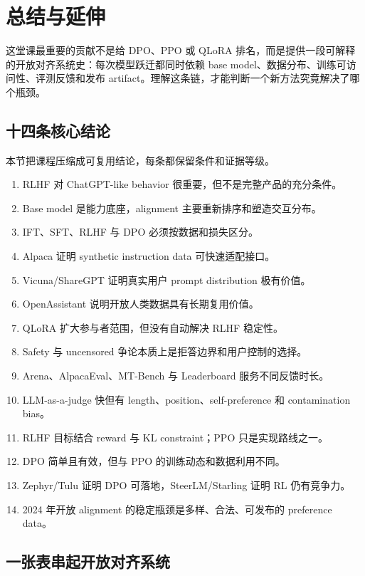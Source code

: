 \documentclass[a4paper]{article}
\begin{document}
\section{总结与延伸}

这堂课最重要的贡献不是给 DPO、PPO 或 QLoRA 排名，而是提供一段可解释的开放对齐系统史：每次模型跃迁都同时依赖 base model、数据分布、训练可访问性、评测反馈和发布 artifact。理解这条链，才能判断一个新方法究竟解决了哪个瓶颈。

\subsection{十四条核心结论}

本节把课程压缩成可复用结论，每条都保留条件和证据等级。

\begin{enumerate}
  \item RLHF 对 ChatGPT-like behavior 很重要，但不是完整产品的充分条件。
  \item Base model 是能力底座，alignment 主要重新排序和塑造交互分布。
  \item IFT、SFT、RLHF 与 DPO 必须按数据和损失区分。
  \item Alpaca 证明 synthetic instruction data 可快速适配接口。
  \item Vicuna/ShareGPT 证明真实用户 prompt distribution 极有价值。
  \item OpenAssistant 说明开放人类数据具有长期复用价值。
  \item QLoRA 扩大参与者范围，但没有自动解决 RLHF 稳定性。
  \item Safety 与 uncensored 争论本质上是拒答边界和用户控制的选择。
  \item Arena、AlpacaEval、MT-Bench 与 Leaderboard 服务不同反馈时长。
  \item LLM-as-a-judge 快但有 length、position、self-preference 和 contamination bias。
  \item RLHF 目标结合 reward 与 KL constraint；PPO 只是实现路线之一。
  \item DPO 简单且有效，但与 PPO 的训练动态和数据利用不同。
  \item Zephyr/Tulu 证明 DPO 可落地，SteerLM/Starling 证明 RL 仍有竞争力。
  \item 2024 年开放 alignment 的稳定瓶颈是多样、合法、可发布的 preference data。
\end{enumerate}

\subsection{一张表串起开放对齐系统}
\end{document}
